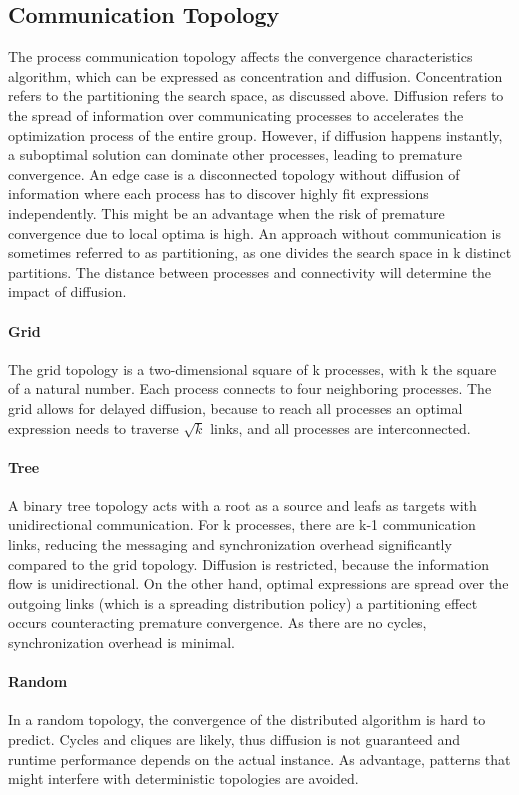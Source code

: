 \subsection{Communication Topology}
The process communication topology affects the convergence characteristics algorithm, which can be expressed as concentration and diffusion.
Concentration refers to the partitioning the search space, as discussed above. Diffusion refers to the spread of information over communicating processes to accelerates the optimization process of the entire group. However, if diffusion happens instantly, a suboptimal solution can dominate other processes, leading to premature convergence.  An edge case is a disconnected topology without diffusion of information where each process has to discover highly fit expressions independently. This might be an advantage when the risk of premature convergence due to local optima is high. An approach without communication is sometimes referred to as partitioning, as one divides the search space in k distinct partitions.
The distance between processes and connectivity will determine the impact of diffusion.

\paragraph{Grid}
The grid topology is a two-dimensional square of k processes, with k the square of a natural number. Each process connects to four neighboring processes. The grid allows for delayed diffusion, because to reach all processes an optimal expression needs to traverse $\sqrt{k}$ links, and all processes are interconnected.

\paragraph{Tree}
A binary tree topology acts with a root as a source and leafs as targets with unidirectional communication. For k processes, there are k-1 communication links, reducing the messaging and synchronization overhead significantly compared to the grid topology. Diffusion is restricted, because the information flow is unidirectional. On the other hand, optimal expressions are spread over the outgoing links (which is a spreading distribution policy) a partitioning effect occurs counteracting premature convergence. As there are no cycles, synchronization overhead is minimal.

\paragraph{Random}
In a random topology, the convergence of the distributed algorithm is hard to predict. Cycles and cliques are likely, thus diffusion is not guaranteed and runtime performance depends on the actual instance. As advantage, patterns that might interfere with deterministic topologies are avoided.
